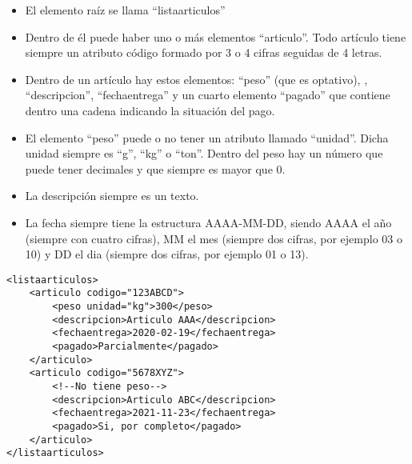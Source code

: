 \documentclass{examen}
\begin{document}

\begin{itemize}
\item{    El elemento raíz se llama ``listaarticulos''}
\item{    Dentro de él puede haber uno o más elementos ``articulo''. Todo artículo tiene siempre un atributo código formado por 3 o 4 cifras seguidas de 4 letras.}
\item{  Dentro de un artículo hay estos elementos: ``peso'' (que es optativo), , ``descripcion'', ``fechaentrega'' y un cuarto elemento ``pagado'' que contiene dentro una cadena indicando la situación del pago.}
\item{   El elemento ``peso'' puede o no tener un atributo llamado ``unidad''. Dicha unidad siempre es ``g'', ``kg'' o ``ton''. Dentro del peso hay un número que puede tener decimales y que siempre es mayor que 0.}
\item{La descripción siempre es un texto.}
\item{La fecha siempre tiene la estructura AAAA-MM-DD, siendo AAAA el año (siempre con cuatro cifras), MM el mes (siempre dos cifras, por ejemplo 03 o 10) y DD el dia (siempre dos cifras, por ejemplo 01 o 13).}

\end{itemize}

\break




\begin{verbatim}
<listaarticulos>
    <articulo codigo="123ABCD">
        <peso unidad="kg">300</peso>
        <descripcion>Articulo AAA</descripcion>
        <fechaentrega>2020-02-19</fechaentrega>
        <pagado>Parcialmente</pagado>
    </articulo>
    <articulo codigo="5678XYZ">
        <!--No tiene peso-->
        <descripcion>Articulo ABC</descripcion>
        <fechaentrega>2021-11-23</fechaentrega>
        <pagado>Si, por completo</pagado>
    </articulo>
</listaarticulos>
\end{verbatim}
\end{document}
